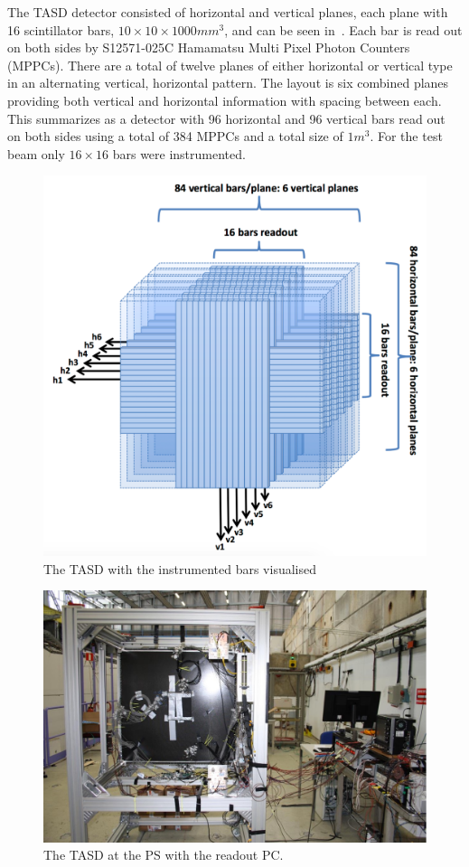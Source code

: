 The TASD detector consisted of horizontal and vertical planes, each plane with 16 scintillator bars, $10\times10\times1000 mm^3$, and can be seen in~. Each bar is read out on both sides by S12571-025C Hamamatsu Multi Pixel Photon Counters (MPPCs). There are a total of twelve planes of either horizontal or vertical type in an alternating vertical, horizontal pattern. The layout is six combined planes providing both vertical and horizontal information with spacing between each. This summarizes as a detector with 96 horizontal and 96 vertical bars read out on both sides using a total of 384 MPPCs and a total size of $1m^3$.  For the test beam only $16 \times 16$ bars were instrumented.


\begin{figure}[h!]
\centering
\includegraphics[width=\textwidth]{figures/AIDA.png}
\caption{The TASD with the instrumented bars visualised}
\label{fig:TASD}
\end{figure}

\begin{figure}[h!]
\centering
\includegraphics[width=\textwidth]{figures/TASDinstrumented.jpeg}
\caption{The TASD at the PS with the readout PC.}
\label{fig:TASDreal}
\end{figure}

